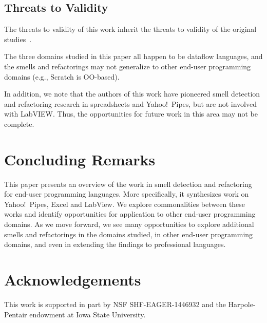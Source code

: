 \documentclass[10pt,conference,compsocconf]{IEEEtran}
\newcommand{\todo}[1]{\textbf{TODO: #1}}
\begin{document}

\subsection{Threats to Validity}
The threats to validity of this work inherit the threats to validity of the original studies~\cite{Stolee2015, Stolee2011, StoleeTSE2013, Hermans2011, Hermans2012intra, Hermans2012inter, hermans2014bumblebee, chambers2013smell, chambers2015impact, badame2012refactoring}.

The three domains studied in this paper all happen to be dataflow languages, and the smells and refactorings may not generalize to other end-user programming domains (e.g., Scratch is OO-based). 

In addition, we note that the authors of this work have pioneered smell detection and refactoring research in spreadsheets and Yahoo!\ Pipes, but are not involved with LabVIEW. Thus, the opportunities for future work in this area may not be complete.  

\section{Concluding Remarks}
\label{sec:conclusions}
This paper presents an overview of the work in smell detection and refactoring for end-user programming languages. More specifically, it synthesizes work on Yahoo!\ Pipes, Excel and LabView. We explore commonalities between these works and identify opportunities for application to other end-user programming domains. As we move forward, we see many opportunities to explore additional smells and refactorings in the domains studied, in other end-user programming domains, and even in extending the findings to professional languages. 

\balance

\section*{Acknowledgements}
This work is supported in part by  NSF SHF-EAGER-1446932 and the Harpole-Pentair endowment at Iowa State University.




\end{document}
